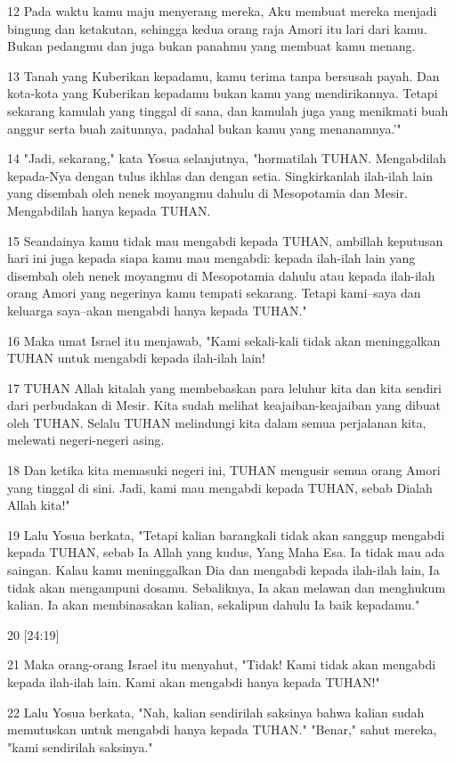 \par 12 Pada waktu kamu maju menyerang mereka, Aku membuat mereka menjadi bingung dan ketakutan, sehingga kedua orang raja Amori itu lari dari kamu. Bukan pedangmu dan juga bukan panahmu yang membuat kamu menang.
\par 13 Tanah yang Kuberikan kepadamu, kamu terima tanpa bersusah payah. Dan kota-kota yang Kuberikan kepadamu bukan kamu yang mendirikannya. Tetapi sekarang kamulah yang tinggal di sana, dan kamulah juga yang menikmati buah anggur serta buah zaitunnya, padahal bukan kamu yang menanamnya.'"
\par 14 "Jadi, sekarang," kata Yosua selanjutnya, "hormatilah TUHAN. Mengabdilah kepada-Nya dengan tulus ikhlas dan dengan setia. Singkirkanlah ilah-ilah lain yang disembah oleh nenek moyangmu dahulu di Mesopotamia dan Mesir. Mengabdilah hanya kepada TUHAN.
\par 15 Seandainya kamu tidak mau mengabdi kepada TUHAN, ambillah keputusan hari ini juga kepada siapa kamu mau mengabdi: kepada ilah-ilah lain yang disembah oleh nenek moyangmu di Mesopotamia dahulu atau kepada ilah-ilah orang Amori yang negerinya kamu tempati sekarang. Tetapi kami--saya dan keluarga saya--akan mengabdi hanya kepada TUHAN."
\par 16 Maka umat Israel itu menjawab, "Kami sekali-kali tidak akan meninggalkan TUHAN untuk mengabdi kepada ilah-ilah lain!
\par 17 TUHAN Allah kitalah yang membebaskan para leluhur kita dan kita sendiri dari perbudakan di Mesir. Kita sudah melihat keajaiban-keajaiban yang dibuat oleh TUHAN. Selalu TUHAN melindungi kita dalam semua perjalanan kita, melewati negeri-negeri asing.
\par 18 Dan ketika kita memasuki negeri ini, TUHAN mengusir semua orang Amori yang tinggal di sini. Jadi, kami mau mengabdi kepada TUHAN, sebab Dialah Allah kita!"
\par 19 Lalu Yosua berkata, "Tetapi kalian barangkali tidak akan sanggup mengabdi kepada TUHAN, sebab Ia Allah yang kudus, Yang Maha Esa. Ia tidak mau ada saingan. Kalau kamu meninggalkan Dia dan mengabdi kepada ilah-ilah lain, Ia tidak akan mengampuni dosamu. Sebaliknya, Ia akan melawan dan menghukum kalian. Ia akan membinasakan kalian, sekalipun dahulu Ia baik kepadamu."
\par 20 [24:19]
\par 21 Maka orang-orang Israel itu menyahut, "Tidak! Kami tidak akan mengabdi kepada ilah-ilah lain. Kami akan mengabdi hanya kepada TUHAN!"
\par 22 Lalu Yosua berkata, "Nah, kalian sendirilah saksinya bahwa kalian sudah memutuskan untuk mengabdi hanya kepada TUHAN." "Benar," sahut mereka, "kami sendirilah saksinya."

